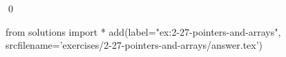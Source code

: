 
\begin{ex}
  \label{ex:2-27-pointers-and-arrays}
  
  \qed
\end{ex}
\begin{python0}
from solutions import *
add(label="ex:2-27-pointers-and-arrays",
    srcfilename='exercises/2-27-pointers-and-arrays/answer.tex')
\end{python0}

